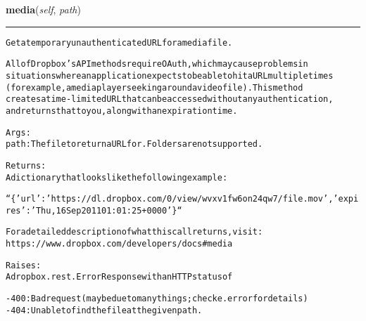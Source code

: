 \hspace{.8\funcindent}\begin{boxedminipage}{\funcwidth}

    \raggedright \textbf{media}(\textit{self}, \textit{path})

    \vspace{-1.5ex}

    \rule{\textwidth}{0.5\fboxrule}
\setlength{\parskip}{2ex}
\begin{alltt}
Get a temporary unauthenticated URL for a media file.

All of Dropbox's API methods require OAuth, which may cause problems in
situations where an application expects to be able to hit a URL multiple times
(for example, a media player seeking around a video file). This method
creates a time-limited URL that can be accessed without any authentication,
and returns that to you, along with an expiration time.

Args:
    path: The file to return a URL for. Folders are not supported.

Returns:
    A dictionary that looks like the following example:

    ``\{'url': 'https://dl.dropbox.com/0/view/wvxv1fw6on24qw7/file.mov', 'expires': 'Thu, 16 Sep 2011 01:01:25 +0000'\}``

    For a detailed description of what this call returns, visit:
    https://www.dropbox.com/developers/docs\#media

Raises:
    A dropbox.rest.ErrorResponse with an HTTP status of

    - 400: Bad request (may be due to many things; check e.error for details)
    - 404: Unable to find the file at the given path.
\end{alltt}

\setlength{\parskip}{1ex}
    \end{boxedminipage}

    \label{lib:dropbox:DropboxClient:share}

    \vspace{0.5ex}

